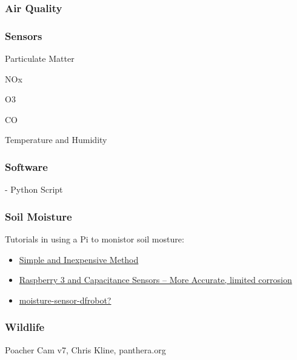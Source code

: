 \documentclass{article}\usepackage[]{graphicx}\usepackage[]{color}
\begin{document}

\subsubsection{Air Quality}

\subsubsection{Sensors}

Particulate Matter

NOx

O3

CO

Temperature and Humidity

\subsubsection{Software}

- Python Script

\subsubsection{Soil Moisture}

Tutorials in using a Pi to monistor soil mosture:

\begin{itemize}

\item \href{https://tutorials-raspberrypi.com/measuring-soil-moisture-with-raspberry-pi/}{Simple and Inexpensive Method}

\item \href{moisture-sensor-dfrobothttps://www.switchdoc.com/2018/11/tutorial-capacitive-moisture-sensor-grove/}{Raspberry 3 and Capacitance Sensors -- More Accurate, limited corrosion}

\item \href{https://tutorials-raspberrypi.com/raspberry-pi-capacitive-spoil-moisture-sensor-dfrobot-gravity/}{moisture-sensor-dfrobot?}
\end{itemize}

\subsubsection{Wildlife}

Poacher Cam v7, Chris Kline, panthera.org
\end{document}
